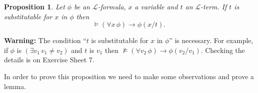 \documentclass[11pt]{article}
\newtheorem{proposition}[theorem]{Proposition}
\newcommand{\mcal}[1]{\mathcal{#1}}
\begin{document}
\begin{proposition}\label{soundnesssubax}
Let $\phi$ be an $\mcal{L}$-formula, $x$ a variable and $t$ an $\mcal{L}$-term. If $t$ is substitutable for $x$ in $\phi$ then
\[\models (\forall x \,\phi)\rightarrow \phi(x/t).\]
\end{proposition}


\noindent
\textbf{Warning:} The condition ``$t$ is substitutable for $x$ in $\phi$'' is necessary. For example, if $\phi$ is $(\exists v_1\, v_1\neq v_2)$ and $t$ is $v_1$ then $\nvDash (\forall v_2 \,\phi)\rightarrow \phi(v_2/v_1)$. Checking the details is on Exercise Sheet 7.

\bigskip

In order to prove this proposition we need to make some observations and prove a lemma.
\end{document}

